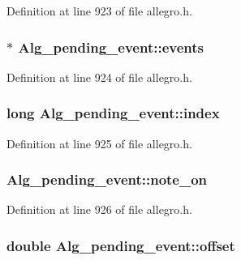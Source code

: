 Definition at line 923 of file allegro.\+h.

\subsubsection[{\texorpdfstring{events}{events}}]{$\ast$ Alg\+\_\+pending\+\_\+event\+::events}\hypertarget{struct_alg__pending__event_af6d5ffc2eca945988f37a3cdf07eb694}{}\label{struct_alg__pending__event_af6d5ffc2eca945988f37a3cdf07eb694}


Definition at line 924 of file allegro.\+h.

\subsubsection[{\texorpdfstring{index}{index}}]{\setlength{\rightskip}{0pt plus 5cm}long Alg\+\_\+pending\+\_\+event\+::index}\hypertarget{struct_alg__pending__event_a77e92c8e31db9053f9f88c56a882ca77}{}\label{struct_alg__pending__event_a77e92c8e31db9053f9f88c56a882ca77}


Definition at line 925 of file allegro.\+h.

\subsubsection[{\texorpdfstring{note\+\_\+on}{note_on}}]{ Alg\+\_\+pending\+\_\+event\+::note\+\_\+on}\hypertarget{struct_alg__pending__event_a157ecddba184bfb9232bfa57dd456079}{}\label{struct_alg__pending__event_a157ecddba184bfb9232bfa57dd456079}


Definition at line 926 of file allegro.\+h.

\subsubsection[{\texorpdfstring{offset}{offset}}]{\setlength{\rightskip}{0pt plus 5cm}double Alg\+\_\+pending\+\_\+event\+::offset}\hypertarget{struct_alg__pending__event_ab60d942720d83309e9a55b29f516c2b7}{}\label{struct_alg__pending__event_ab60d942720d83309e9a55b29f516c2b7}


